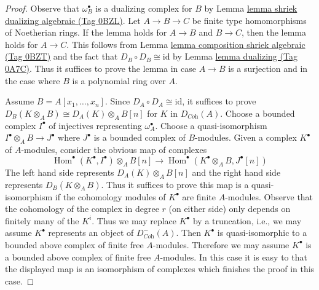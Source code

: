 \documentclass{amsart}
\theoremstyle{plain}
\theoremstyle{definition}
\theoremstyle{remark}
\numberwithin{equation}{subsection}
\def\Hom{\mathop{\mathrm{Hom}}\nolimits}
\begin{document}
\begin{proof}
Observe that $\omega_B^\bullet$ is a dualizing complex for $B$ by
Lemma \href{https://stacks.math.columbia.edu/tag/0BZL}{lemma shriek dualizing algebraic (Tag 0BZL)}.
Let $A \to B \to C$ be finite type homomorphisms of Noetherian rings.
If the lemma holds for $A \to B$ and $B \to C$, then the lemma holds for
$A \to C$. This follows from
Lemma \href{https://stacks.math.columbia.edu/tag/0BZT}{lemma composition shriek algebraic (Tag 0BZT)}
and the fact that $D_B \circ D_B \cong \text{id}$ by
Lemma \href{https://stacks.math.columbia.edu/tag/0A7C}{lemma dualizing (Tag 0A7C)}.
Thus it suffices to prove the lemma in case $A \to B$ is
a surjection and in the case where $B$ is a
polynomial ring over $A$.

\medskip\noindent
Assume $B = A[x_1, \ldots, x_n]$. Since $D_A \circ D_A \cong \text{id}$,
it suffices to prove
$D_B(K \otimes_A B) \cong D_A(K) \otimes_A B[n]$ for $K$
in $D_{\textit{Coh}}(A)$.
Choose a bounded complex $I^\bullet$ of injectives representing
$\omega_A^\bullet$. Choose a quasi-isomorphism
$I^\bullet \otimes_A B \to J^\bullet$ where $J^\bullet$
is a bounded complex of $B$-modules. Given a complex
$K^\bullet$ of $A$-modules, consider the obvious
map of complexes
$$
\Hom^\bullet(K^\bullet, I^\bullet) \otimes_A B[n]
\longrightarrow
\Hom^\bullet(K^\bullet \otimes_A B, J^\bullet[n])
$$
The left hand side represents $D_A(K) \otimes_A B[n]$ and the right hand
side represents $D_B(K \otimes_A B)$. Thus it suffices to prove this
map is a quasi-isomorphism if the cohomology modules
of $K^\bullet$ are finite $A$-modules. Observe that the
cohomology of the complex in degree $r$ (on either side)
only depends on finitely many of the $K^i$. Thus we may
replace $K^\bullet$ by a truncation, i.e., we may assume
$K^\bullet$ represents an object of $D^-_{\textit{Coh}}(A)$.
Then $K^\bullet$ is quasi-isomorphic to a bounded
above complex of finite free $A$-modules.
Therefore we may assume $K^\bullet$ is a bounded
above complex of finite free $A$-modules.
In this case it is easy to that the
displayed map is an isomorphism of complexes which finishes
the proof in this case.


\end{proof}
\end{document}
